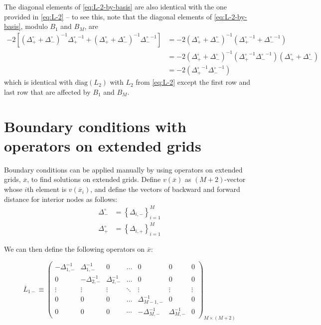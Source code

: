 \documentclass[11pt]{article}
\newcommand{\set}[1]{\ensuremath{\left\{{#1}\right\}}}
\theoremstyle{definition}
\begin{document}
The diagonal elements of \eqref{eq:L-2-by-basis} are also identical with the one provided in \eqref{eq:L-2} -- to see this, note that the diagonal elements of \eqref{eq:L-2-by-basis}, modulo $B_1$ and $B_{M}$, are
\begin{align}
-2 \left[ ({\Delta_{+}^{\circ}} + {\Delta_{-}^{\circ}})^{-1} {\Delta_{+}^{\circ}}^{-1} + ({\Delta_{+}^{\circ}} + {\Delta_{-}^{\circ}})^{-1} {\Delta_{-}^{\circ}}^{-1} \right] &= -2 ({\Delta_{+}^{\circ}} + {\Delta_{-}^{\circ}})^{-1}  ( {\Delta_{+}^{\circ}}^{-1} + {\Delta_{-}^{\circ}}^{-1} ) \\
&= -2({\Delta_{+}^{\circ}} + {\Delta_{-}^{\circ}})^{-1} ({\Delta_{+}^{\circ}}^{-1} {\Delta_{-}^{\circ}}^{-1}) ({\Delta_{+}^{\circ}} + {\Delta_{-}^{\circ}} )  \\
&= -2 ({\Delta_{+}^{\circ}}^{-1} {\Delta_{-}^{\circ}}^{-1})
\end{align}
which is identical with $\text{diag} (L_2)$ with $L_2$ from \eqref{eq:L-2} except the first row and last row that are affected by $B_1$ and $B_{M}$.

\fi 

\section{Boundary conditions with operators on extended grids}
Boundary conditions can be applied manually by using operators on extended grids, $\overline{x}$, to find solutions on extended grids. Define $v(\overline{x})$ as $(M+2)$-vector whose $i$th element is $v(\overline {x}_i)$, and define the vectors of backward and forward distance for interior nodes as follows: 
\begin{align}
\Delta_{-}^\circ &= \set{\Delta_{i,-}}_{i=1}^M \\
\Delta_{+}^\circ &= \set{\Delta_{i,+}}_{i=1}^M
\end{align}


We can then define the following operators on $\overline{x}$:


\begin{equation}\label{eq:L-1-minus-extended}
\overline{L}_{1-} \equiv\begin{pmatrix}
-\Delta_{1,-}^{-1}&\Delta_{1,-}^{-1}&0&\dots&0&0&0\\
0&-\Delta_{2,-}^{-1}&\Delta_{2,-}^{-1}&\dots&0&0&0\\
\vdots&\vdots&\vdots&\ddots&\vdots&\vdots&\vdots\\
0&0&0&\dots&\Delta_{M-1,-}^{-1}&0&0\\
0&0&0&\cdots&-\Delta_{M,-}^{-1}&\Delta_{M,-}^{-1}&0
\end{pmatrix}_{M\times (M+2)}
\end{equation}
\end{document}
